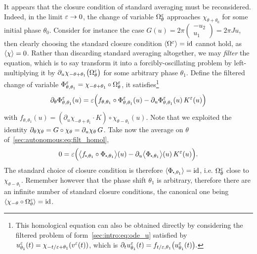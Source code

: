 It appears that the closure condition of standard averaging must be
reconsidered. Indeed, in the limit $\varepsilon \rightarrow 0$, the change of
variable $\Omega^{\varepsilon}_\theta$ approaches $\chi_{\theta+\theta_0}$ for some
initial phase $\theta_0$. Consider for instance the case $G(u) =
2\pi\begin{pmatrix} -u_2 \\ u_1 \end{pmatrix} = 2\pi Ju$, then clearly
choosing the standard closure condition $\langle \Omega^{\varepsilon} \rangle = \operatorname{id}$ cannot
hold, as $\langle \chi \rangle = 0$. 
%
Rather than discarding standard averaging altogether, we may
\textit{filter} the equation, which is to say transform it into a
forcibly-oscillating problem by left-multiplying it by $\partial_u
\chi_{-\theta+\theta_1} \big(\Omega^{\varepsilon}_\theta \big)$ for some arbitrary
phase $\theta_1$. Define the filtered change of variable
$\Phi^{\varepsilon}_{\theta, \theta_1} = \chi_{-\theta + \theta_1} \circ
\Omega^{\varepsilon}_{\theta}$, it satisfies\footnote{ %
  This homological equation can also be obtained directly by considering
  the filtered problem of form~\eqref{sec:intro:eq:ode_u} satisfied by
  $u^{\varepsilon}_{\theta_1}(t) = \chi_{-t/\varepsilon+\theta_1}(v^{\varepsilon}(t))$, which is $
  \partial_t u^{\varepsilon}_{\theta_1}(t) = f_{t/\varepsilon, \theta_1} \big( u^{\varepsilon}
  _{\theta_1} (t) \big). $ %
}
\begin{equation} \label{sec:autonomous:eq:filt_homol}
  \partial_\theta \Phi^{\varepsilon}_{\theta, \theta_1} (u)
  = \varepsilon\Big( f_{\theta, \theta_1} \circ \Phi^{\varepsilon}_{\theta, \theta_1}(u) - \partial_u \Phi^{\varepsilon}_{\theta, \theta_1}(u) \, K^{\varepsilon}(u) \Big) 
\end{equation}
with $f_{\theta, \theta_1}(u) = \left(\partial_u \chi_{-\theta +
\theta_1}\cdot K \right) \circ \chi_{\theta-\theta_1}(u)$. Note that we
exploited the identity $\partial_\theta \chi_\theta = G \circ \chi_\theta =
\partial_u \chi_\theta \, G$. 
%
Take now the average on $\theta$ of~\eqref{sec:autonomous:eq:filt_homol},
\begin{equation} \label{sec:autonumous:eq:filt_homol_avg}
  0 = \eps\Big( 
    \bLL f_{\bigcdot, \theta_1}  \circ \Phi_{\bigcdot, \theta_1} \bRR (u) 
    - \pa_u \bLL \Phi_{\bigcdot, \theta_1} \bRR (u) \, K^\eps(u) 
  \Big) . 
\end{equation}
The standard choice of closure condition is therefore $\LL
\Phi_{\bigcdot, \theta_1} \RR = \id$, i.e. $\Omega^{\varepsilon}_\theta$ close to
$\chi_{\theta - \theta_1}$. Remember however that the phase shift
$\theta_1$ is arbitrary, therefore there are an infinite number of
standard closure conditions, the canonical one being $\langle \chi_{-\theta}
\circ \Omega^{\varepsilon}_\theta \rangle = \operatorname{id}$. 

